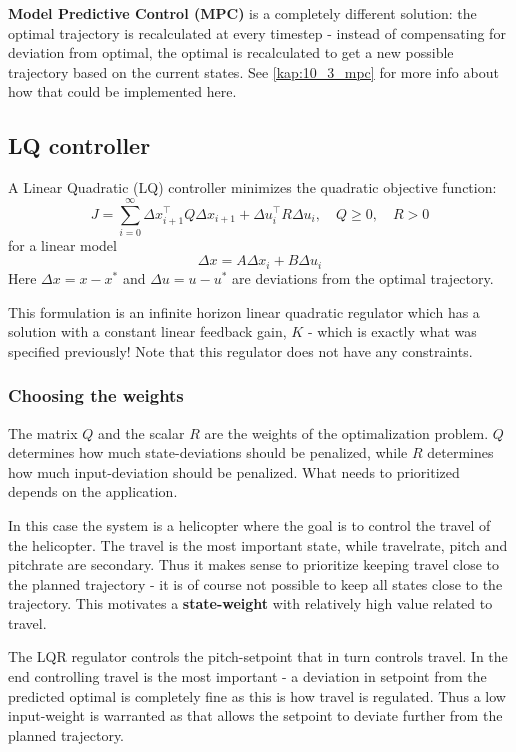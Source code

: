 \documentclass[../main.tex]{subfiles}
\begin{document}
\textbf{Model Predictive Control (MPC)} is a completely different solution: the optimal trajectory is recalculated at every timestep - instead of compensating for deviation from optimal, the optimal is recalculated to get a new possible trajectory based on the current states. See \cref{kap:10_3_mpc} for more info about how that could be implemented here.

\subsection{LQ controller} \label{kap:task_10_3_LQ_controller}
A Linear Quadratic (LQ) controller minimizes the quadratic objective function:
\begin{equation}
    J = \sum^\infty_{i=0} \Delta x_{i+1}^\top Q \Delta x_{i+1} + \Delta u_i^\top R \Delta u_i, \quad Q \ge0, \quad R > 0
\end{equation}
for a linear model
\begin{equation}\label{eq:lab3_lin_model}
	\Delta x=A\Delta x_i + B \Delta u_i
\end{equation}
Here $ \Delta x = x - x^*$ and $\Delta u = u - u^*$ are deviations from the optimal trajectory.

This formulation is an infinite horizon linear quadratic regulator which has a solution with a constant linear feedback gain, $K$ - which is exactly what was specified previously! Note that this regulator does not have any constraints.

\subsubsection{Choosing the weights} 
The matrix $Q$ and the scalar $R$ are the weights of the optimalization problem. $Q$ determines how much state-deviations should be penalized, while $R$ determines how much input-deviation should be penalized. What needs to prioritized depends on the application.

In this case the system is a helicopter where the goal is to control the travel of the helicopter. The travel is the most important state, while travelrate, pitch and pitchrate are secondary. Thus it makes sense to prioritize keeping travel close to the planned trajectory - it is of course not possible to keep all states close to the trajectory. This motivates a \textbf{state-weight} with relatively high value related to travel.

The LQR regulator controls the pitch-setpoint that in turn controls travel. In the end controlling travel is the most important - a deviation in setpoint from the predicted optimal is completely fine as this is how travel is regulated. Thus a low input-weight is warranted as that allows the setpoint to deviate further from the planned trajectory.
\end{document}

